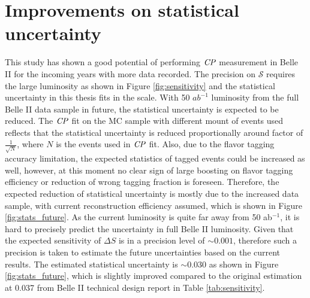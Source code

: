 
\section{Improvements on statistical uncertainty}
This study has shown a good potential of performing $\it{CP}$ measurement in Belle II for the incoming years with more data recorded. The precision on $\mathcal{S}$ requires the large luminosity as shown in Figure \ref{fig:sensitivity} and the statistical uncertainty in this thesis fits in the scale. With 50 $ab^{-1}$ luminosity from the full Belle II data sample in future, the statistical uncertainty is expected to be reduced. The $\it{CP}$ fit on the MC sample with different mount of events used reflects that the statistical uncertainty is reduced proportionally around factor of $\frac{1}{\sqrt{N}}$, where $N$ is the events used in $\it{CP}$ fit. Also, due to the flavor tagging accuracy limitation, the expected statistics of tagged events could be increased as well, however, at this moment no clear sign of large boosting on flavor tagging efficiency or reduction of wrong tagging fraction is foreseen. Therefore, the expected reduction of statistical uncertainty is mostly due to the increased data sample, with current reconstruction efficiency assumed, which is shown in Figure \ref{fig:stats_future}.  As the current luminosity is quite far away from 50 ab$^{-1}$, it is hard to precisely predict the uncertainty in full Belle II luminosity. Given that the expected sensitivity of $\Delta S$ is in a precision level of $\sim 0.001$, therefore such a precision is taken to estimate the future uncertainties based on the current results. The estimated statistical uncertainty is  $\sim 0.030$ as shown in Figure \ref{fig:stats_future}, which is slightly improved compared to the original estimation at 0.037 from Belle II technical design report in Table \ref{tab:sensitivity}. 

